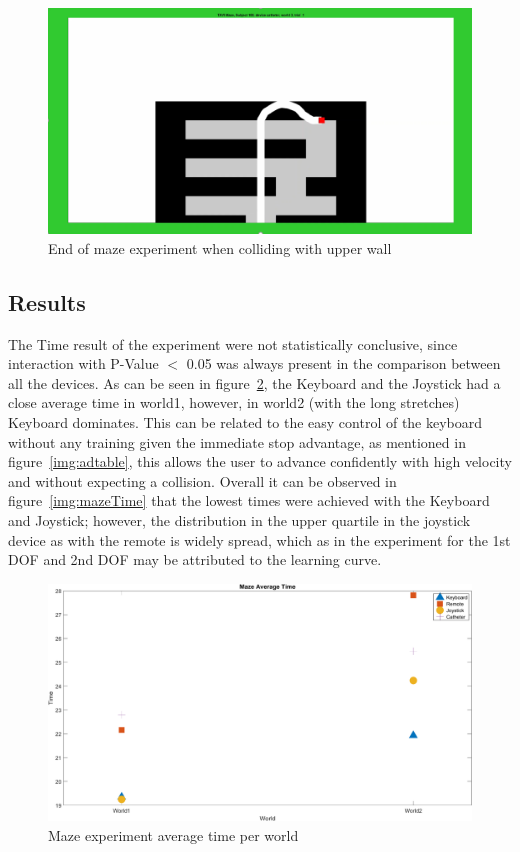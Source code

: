 \begin{figure}[ht]
   \centering
   \includegraphics[width=1.0\textwidth]{img/maze/mazeEnd.png}
   \caption{End of maze experiment when colliding with upper wall}
   \label{img:mazeEnd}
\end{figure}

\subsection{Results}\label{subsec:2ndres}
The Time result of the experiment were not statistically conclusive, since interaction with P-Value $<$ 0.05 was always present in the comparison between all the devices. As can be seen in figure~\ref{img:mazeAvgTime}, the Keyboard and the Joystick had a close average time in world1, however, in world2 (with the long stretches) Keyboard dominates. This can be related to the easy control of the keyboard without any training given the immediate stop advantage, as mentioned in figure~\ref{img:adtable}, this allows the user to advance confidently with high velocity and without expecting a collision. Overall it can be observed in figure~\ref{img:mazeTime} that the lowest times were achieved with the Keyboard and Joystick; however, the distribution in the upper quartile in the joystick device as with the remote is widely spread, which as in the experiment for the 1st DOF and 2nd DOF may be attributed to the learning curve.\\

\begin{figure}[ht]
   \centering
   \includegraphics[width=1.0\textwidth]{img/maze/mazeAvgTime.png}
   \caption{Maze experiment average time per world}
   \label{img:mazeAvgTime}
\end{figure}

